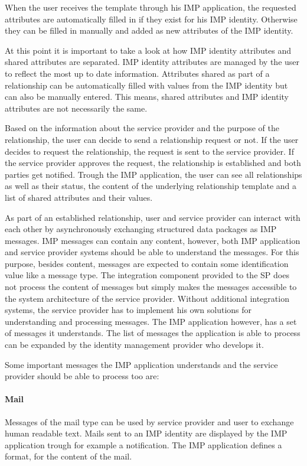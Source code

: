 When the user receives the template through his IMP application, the requested attributes are automatically filled in if they exist for his IMP identity. Otherwise they can be filled in manually and added as new attributes of the IMP identity.

At this point it is important to take a look at how IMP identity attributes and shared attributes are separated. IMP identity attributes are managed by the user to reflect the most up to date information. Attributes shared as part of a relationship can be automatically filled with values from the IMP identity but can also be manually entered. This means, shared attributes and IMP identity attributes are not necessarily the same. 

Based on the information about the service provider and the purpose of the relationship, the user can decide to send a relationship request or not. If the user decides to request the relationship, the request is sent to the service provider. If the service provider approves the request, the relationship is established and both parties get notified. Trough the IMP application, the user can see all relationships as well as their status, the content of the underlying relationship template and a list of shared attributes and their values.

As part of an established relationship, user and service provider can interact with each other by asynchronously exchanging structured data packages as IMP messages. IMP messages can contain any content, however, both IMP application and service provider systems should be able to understand the messages. For this purpose, besides content, messages are expected to contain some identification value like a message type. The integration component provided to the SP does not process the content of messages but simply makes the messages accessible to the system architecture of the service provider. Without additional integration systems, the service provider has to implement his own solutions for understanding and processing messages. The IMP application however, has a set of messages it understands. The list of messages the application is able to process can be expanded by the identity management provider who develops it.

Some important messages the IMP application understands and the service provider should be able to process too are:

\paragraph{Mail} Messages of the mail type can be used by service provider and user to exchange human readable text. Mails sent to an IMP identity are displayed by the IMP application trough for example a notification. The IMP application defines a format, for the content of the mail.
    
